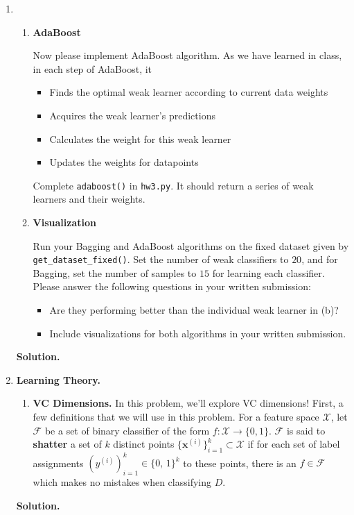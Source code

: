 \documentclass{article}
\newenvironment{Q}
        {%
          \clearpage
          \item
        }
        {%
          \phantom{s} %
          \bigskip
          \textbf{Solution.}
        }
\begin{document}
\begin{enumerate}[font={\Large\bfseries},left=0pt]
\begin{Q}
\begin{enumerate}
    \item \textbf{AdaBoost}

    Now please implement AdaBoost algorithm. As we have learned in class, in each step of AdaBoost, it
    \begin{itemize}
        \item Finds the optimal weak learner according to current data weights
        \item Acquires the weak learner's predictions
        \item Calculates the weight for this weak learner
        \item Updates the weights for datapoints
    \end{itemize}
    Complete \texttt{adaboost()} in \texttt{hw3.py}. It should return a series of weak learners and their weights.
    
    \item \textbf{Visualization}
    
    Run your Bagging and AdaBoost algorithms on the fixed dataset given by \texttt{get\_dataset\_fixed()}. Set the number of weak classifiers to $20$, and for Bagging, set the number of samples to $15$ for learning each classifier. Please answer the following questions in your written submission:
    \begin{itemize}
        \item Are they performing better than the individual weak learner in (b)?
        \item Include visualizations for both algorithms in your written submission.
    \end{itemize}

\end{enumerate}
\end{Q}

\begin{tcolorbox}

\end{tcolorbox}

\begin{Q}
\textbf{\Large Learning Theory.}
\begin{enumerate}
    \item \textbf{VC Dimensions.} In this problem, we'll explore VC dimensions! First, a few definitions that we will use in this problem. For a feature space $\mathcal{X}$, let $\mathcal{F}$ be a set of binary classifier of the form $f:\mathcal{X}\rightarrow\{0, 1\}$. $\mathcal{F}$ is said to \textbf{shatter} a set of $k$ distinct points $\{\bm{x}^{(i)}\}_{i=1}^{k}\subset \mathcal{X}$ if for each set of label assignments $(y^{(i)})_{i=1}^{k} \in \text{\{0, 1\}}^k$ to these points, there is an $f\in \mathcal{F}$ which makes no mistakes when classifying $D$.
  

\end{enumerate}
\end{Q}
\end{enumerate}
\end{document}
